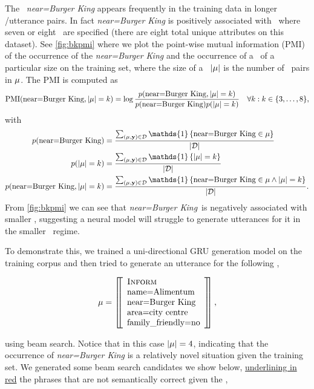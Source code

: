 The \attributevalue~\textit{near=Burger King} appears frequently in the
training data in longer \meaningrepresentation/utterance pairs. In fact
\textit{near=Burger King} is positively associated with
\meaningrepresentations~where seven or eight \attributes~are specified (there
are eight total unique attributes on this dataset). See \autoref{fig:bkpmi}
where we plot the point-wise mutual information (PMI) \citep{church1990} of the
occurrence of the \textit{near=Burger King} and the occurrence of a
\meaningrepresentation~of a particular size on the training set, where the size
of a \meaningrepresentation~${\left\vert \mu \right\vert}$ is the number of
\attributevalue~pairs in $\mu$.  The PMI is computed as 
\[\operatorname*{PMI}(\textrm{near=Burger King},  {\left\vert \mu \right\vert} = k) = \log \frac{p(\textrm{near=Burger King}, {\left\vert \mu \right\vert} = k)}{p( \textrm{near=Burger King}  ) p({\left\vert \mu \right\vert} = k)}     \quad \forall k : k \in \{3,\ldots,8\},\]
with \begin{align*}
    p(\AV{near}{Burger King}) &= \frac{\sum_{(\mr,\utttoks) \in \corpus}\mathds{1}\left\{ \AV{near}{Burger King} \in \mr \right\}}{\setsize{\corpus}} \\
    p(\setsize{\mr}=k) &= \frac{\sum_{(\mr,\utttoks) \in \corpus}\mathds{1}\left\{ \setsize{\mr} = k \right\}}{\setsize{\corpus}} \\
    p(\AV{near}{Burger King},\setsize{\mr}=k) &= \frac{\sum_{(\mr,\utttoks) \in \corpus}\mathds{1}\left\{\AV{near}{Burger King} \in \mr \wedge \setsize{\mr} = k \right\}}{\setsize{\corpus}}.
\end{align*}
From \autoref{fig:bkpmi} we can see that \textit{near=Burger King}~is
negatively associated with smaller \meaningrepresentations, suggesting a neural
model will struggle to generate utterances for it in the smaller
\meaningrepresentation~regime.



To demonstrate this, we trained a uni-directional GRU generation model on the
training corpus and then tried to generate an utterance for the following
\meaningrepresentation,
\begin{singlespace}
\[\mu = \left[\!\!\left[\begin{array}{l}\textsc{Inform}\\
        {\textrm{name=Alimentum}}  \\
        {\textrm{near=Burger King}}\\
        {\textrm{area=city centre}}\\
        {\textrm{family\_friendly=no}}\end{array}  \right]\!\!\right],\]
\end{singlespace}
\noindent using beam search. Notice that in this case ${\left\vert \mu \right\vert}=4$,
indicating that the occurrence of \textit{near=Burger King} is a relatively
novel situation given the training set.  We generated some beam search
candidates we show below, {\color{red}\uline{underlining in red}} the phrases
that are not semantically correct given the \meaningrepresentation,

